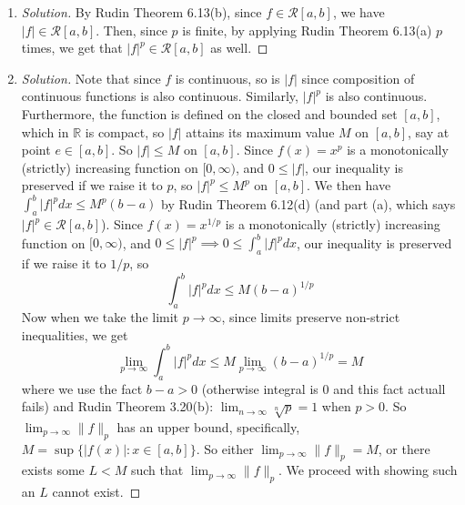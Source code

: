 \documentclass{article}
\newcommand{\R}{{\mathbb R}}
\theoremstyle{remark}
\begin{document}
\begin{enumerate}
	\item \begin{proof}[Solution]\let\qed\relax
		By Rudin Theorem 6.13(b), since $f \in \mathcal{R}[a,b]$,
		we have $|f| \in \mathcal{R}[a,b]$.
		Then, since $p$ is finite,
		by applying Rudin Theorem 6.13(a) $p$ times, we get that
		$|f|^p \in \mathcal{R}[a,b]$ as well.
	\end{proof}
	\item \begin{proof}[Solution]\let\qed\relax
		Note that since $f$ is continuous, so is $|f|$
		since composition of continuous functions is also continuous.
		Similarly, $|f|^p$ is also continuous.
		Furthermore, the function is defined on the closed and bounded set $[a,b]$,
		which in $\R$ is compact,
		so $|f|$ attains its maximum value $M$ on $[a,b]$, say at point $e\in[a,b]$.
		So $|f| \leq M$ on $[a,b]$.
		Since $f(x) = x^p$ is a monotonically (strictly) increasing
		function on $[0,\infty)$,
		and $0 \leq |f|$,
		our inequality is preserved if we raise it to $p$, so
		$|f|^p \leq M^p$ on $[a,b]$.
		We then have $\int_a^b |f|^pdx \leq M^p(b-a)$ by Rudin Theorem 6.12(d)
		(and part (a), which says $|f|^p \in \mathcal{R}[a,b]$).
		Since $f(x) = x^{1/p}$ is a monotonically (strictly) increasing
		function on $[0,\infty)$,
		and $0 \leq |f|^p \implies 0 \leq \int_a^b |f|^pdx$,
		our inequality is preserved if we raise it to $1/p$, so
		\[
			\int_a^b |f|^pdx \leq M(b-a)^{1/p}
		\]
		Now when we take the limit $p \to \infty$,
		since limits preserve non-strict inequalities, we get
		\[
			\lim_{p\to\infty} \int_a^b |f|^pdx \leq M\lim_{p\to\infty} (b-a)^{1/p}
			= M
		\]
		where we use the fact $b - a > 0$
		(otherwise integral is $0$ and this fact actuall fails)
		and Rudin Theorem 3.20(b): $\lim_{n\to\infty} \sqrt[n]{p} = 1$ when $p > 0$.
		So $\lim_{p \to \infty} \lVert f \rVert_p$ has an upper bound,
		specifically, $M = \sup\{|f(x)| \colon x \in [a,b]\}$.
		So either $\lim_{p \to \infty} \lVert f \rVert_p = M$,
		or there exists some $L < M$ such that $\lim_{p \to \infty} \lVert f \rVert_p$.
		We proceed with showing such an $L$ cannot exist.


\end{proof}
\end{enumerate}
\end{document}
